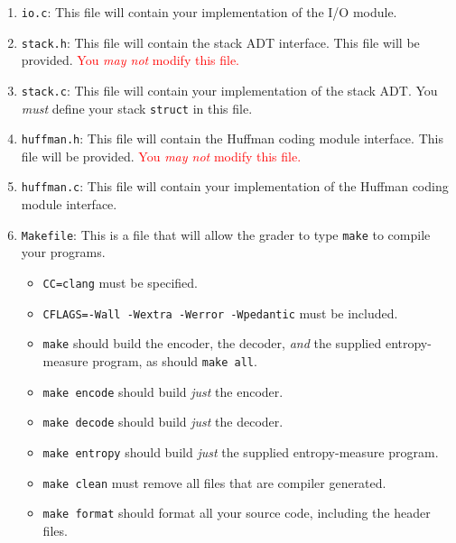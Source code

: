\documentclass[11pt]{article}
\begin{document}
\begin{enumerate}
  \item \texttt{io.c}: This file will contain your implementation of the
    I/O module.

  \item \texttt{stack.h}: This file will contain the stack ADT
    interface. This file will be provided. \textcolor{red}{You \emph{may
    not} modify this file.}

  \item \texttt{stack.c}: This file will contain your implementation of
    the stack ADT. You \emph{must} define your stack \texttt{struct} in
    this file.

  \item \texttt{huffman.h}: This file will contain the Huffman coding
    module interface. This file will be provided. \textcolor{red}{You
    \emph{may not} modify this file.}

  \item \texttt{huffman.c}: This file will contain your implementation
    of the Huffman coding module interface.

  \item \texttt{Makefile}: This is a file that will allow the grader to
    type \texttt{make} to compile your programs.

    \begin{itemize}
      \item \texttt{CC=clang} must be specified.

      \item \texttt{CFLAGS=-Wall -Wextra -Werror -Wpedantic}
        must be included.

      \item \texttt{make} should build the encoder, the decoder,
        \emph{and} the supplied entropy-measure program, as should
        \texttt{make all}.

      \item \texttt{make encode} should build \emph{just} the encoder.

      \item \texttt{make decode} should build \emph{just} the decoder.

      \item \texttt{make entropy} should build \emph{just} the supplied
        entropy-measure program.

      \item \texttt{make clean} must remove all files that are compiler
        generated.

      \item \texttt{make format} should format all your source code,
        including the header files.
    \end{itemize}


\end{enumerate}
\end{document}
